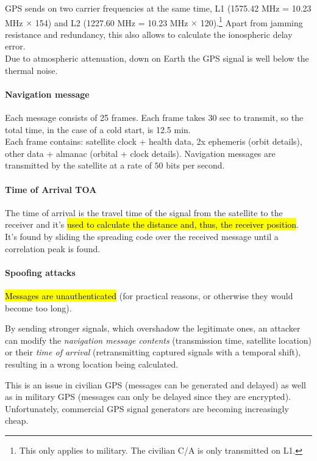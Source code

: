 GPS sends on two carrier frequencies at the same time, L1 (1575.42 MHz = 10.23
MHz $\times$ 154) and L2 (1227.60 MHz = 10.23 MHz $\times$ 120).\footnote{This
	only applies to military. The civilian C/A is only transmitted on L1.} Apart
from jamming resistance and redundancy, this also allows to calculate the
ionospheric delay error. \\ Due to atmospheric attenuation, down on Earth the
GPS signal is well below the thermal noise.%

\paragraph{Navigation message}
Each message consists of 25 frames. Each frame takes 30 sec to transmit, so the
total time, in the case of a cold start, is 12.5 min. \\ Each frame contains:
satellite clock + health data, 2x ephemeris (orbit details), other data +
almanac (orbital + clock details). Navigation messages are transmitted by the
satellite at a rate of $50$ bits per second.

\paragraph{Time of Arrival TOA}
The time of arrival is the travel time of the signal from the satellite to the
receiver and it's \hl{used to calculate the distance and, thus, the receiver
	position}. It's found by sliding the spreading code over the received message
until a correlation peak is found.

\paragraph{Spoofing attacks}
\hl{Messages are unauthenticated} (for practical reasons, or otherwise they would
become too long).

By sending stronger signals, which overshadow the legitimate
ones, an attacker can modify the \textit{navigation message contents}
(transmission time, satellite location) or their \textit{time of arrival}
(retransmitting captured signals with a temporal shift), resulting in a wrong
location being calculated.

This is an issue in civilian GPS (messages can be
generated and delayed) as well as in military GPS (messages can only be delayed
since they are encrypted). Unfortunately, commercial GPS signal generators are
becoming increasingly cheap.

